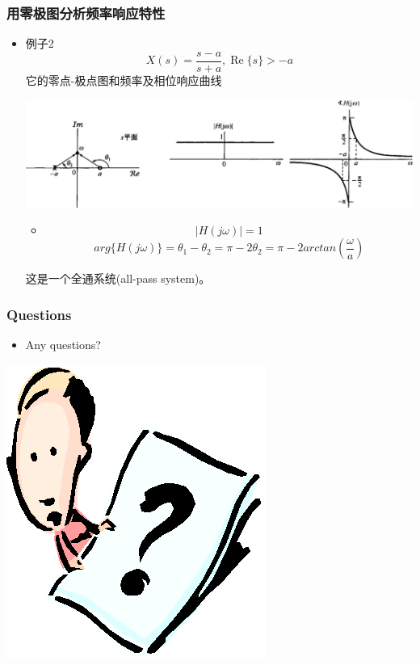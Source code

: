 \documentclass[CJKutf8,dvipsnames,table]{beamer}
\begin{document}
\begin{CJK*}{UTF8}{song}
  \begin{frame}
    \frametitle{用零极图分析频率响应特性}
    \begin{itemize}
    \item 例子2   
\[
X(s)=\frac{s-a}{s+a}, \operatorname{Re}\{s\} > -a
\]
它的零点-极点图和频率及相位响应曲线
    \begin{center}
      \includegraphics[scale=.22]{ss-c-f9-21}
    \end{center}
    	\begin{itemize}
    	\item 
    	\[
    	|H(j\omega)| = 1
    	\]
    	\[    
    	arg\{ H(j\omega) \}= \theta_1 - \theta_2 = \pi - 2\theta_2 = \pi - 2arctan(\frac{\omega}{a})
    	\]
    	\end{itemize}
	这是一个全通系统(all-pass system)。
    \end{itemize}     
  \end{frame}     
    
  \begin{frame}
    \frametitle{Questions}
    \begin{itemize}
    \item Any questions?
    \end{itemize}
    \begin{center}
      \includegraphics[scale=.5]{question}
    \end{center}
  \end{frame}  
  

\end{CJK*}
\end{document}
